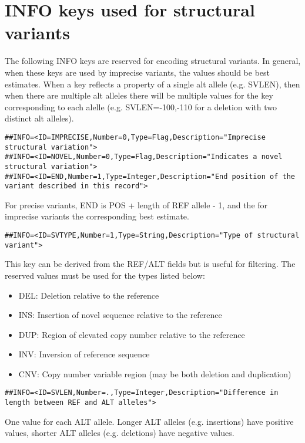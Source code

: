 \documentclass[8pt]{article}
\begin{document}
\section{INFO keys used for structural variants}
\label{sv-info-keys}
The following INFO keys are reserved for encoding structural variants. In general, when these keys are used by imprecise variants, the values should be best estimates. When a key reflects a property of a single alt allele (e.g. SVLEN), then when there are multiple alt alleles there will be multiple values for the key corresponding to each alelle (e.g. SVLEN=-100,-110 for a deletion with two distinct alt alleles).
\footnotesize
\begin{verbatim}
##INFO=<ID=IMPRECISE,Number=0,Type=Flag,Description="Imprecise structural variation">
##INFO=<ID=NOVEL,Number=0,Type=Flag,Description="Indicates a novel structural variation">
##INFO=<ID=END,Number=1,Type=Integer,Description="End position of the variant described in this record">
\end{verbatim}
\normalsize
For precise variants, END is POS + length of REF allele - 1, and the for imprecise variants the corresponding best estimate.

\footnotesize
\begin{verbatim}
##INFO=<ID=SVTYPE,Number=1,Type=String,Description="Type of structural variant">
\end{verbatim}
\normalsize
This key can be derived from the REF/ALT fields but is useful for filtering. The reserved values must be used for the types listed below:
\begin{itemize}
  \item DEL: Deletion relative to the reference
  \item INS: Insertion of novel sequence relative to the reference
  \item DUP: Region of elevated copy number relative to the reference
  \item INV: Inversion of reference sequence
  \item CNV: Copy number variable region (may be both deletion and duplication)
\end{itemize}

\footnotesize
\begin{verbatim}
##INFO=<ID=SVLEN,Number=.,Type=Integer,Description="Difference in length between REF and ALT alleles">
\end{verbatim}
\normalsize
One value for each ALT allele. Longer ALT alleles (e.g. insertions) have positive values, shorter ALT alleles (e.g. deletions) have negative values.
\end{document}
